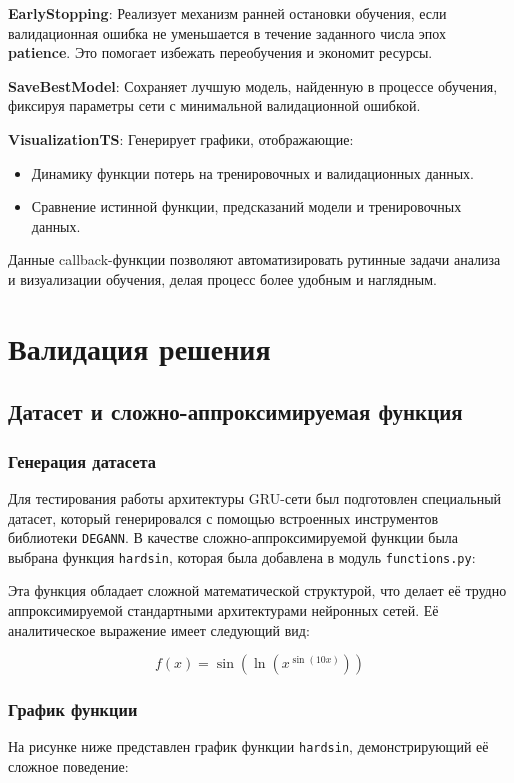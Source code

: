 \textbf{EarlyStopping}: Реализует механизм ранней остановки обучения, если валидационная ошибка не уменьшается в течение заданного числа эпох \textbf{patience}. Это помогает избежать переобучения и экономит ресурсы.

\textbf{SaveBestModel}: Сохраняет лучшую модель, найденную в процессе обучения, фиксируя параметры сети с минимальной валидационной ошибкой.

\textbf{VisualizationTS}: Генерирует графики, отображающие:
\begin{itemize}
    \item Динамику функции потерь на тренировочных и валидационных данных.
    \item Сравнение истинной функции, предсказаний модели и тренировочных данных.
\end{itemize}

Данные callback-функции позволяют автоматизировать рутинные задачи анализа и визуализации обучения, делая процесс более удобным и наглядным.




\section{Валидация решения}



\subsection{Датасет и сложно-аппроксимируемая функция}
\label{subsec:dataset}

\subsubsection{Генерация датасета}
Для тестирования работы архитектуры GRU-сети был подготовлен специальный датасет, который генерировался с помощью встроенных инструментов библиотеки \texttt{DEGANN}. В качестве сложно-аппроксимируемой функции была выбрана функция \texttt{hardsin}, которая была добавлена в модуль \texttt{functions.py}:

Эта функция обладает сложной математической структурой, что делает её трудно аппроксимируемой стандартными архитектурами нейронных сетей. Её аналитическое выражение имеет следующий вид:

\[
f(x) = \sin\left(\ln(x^{\sin(10x)})\right)
\]

\subsubsection{График функции}
На рисунке ниже представлен график функции \texttt{hardsin}, демонстрирующий её сложное поведение:

